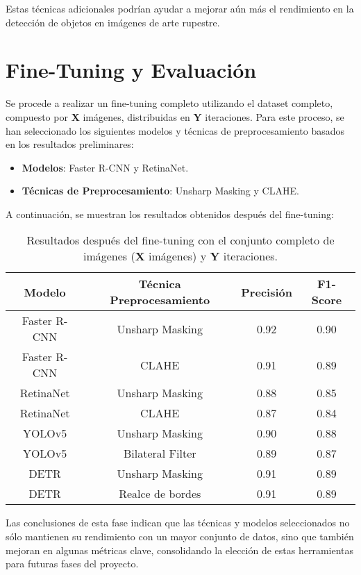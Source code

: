 Estas técnicas adicionales podrían ayudar a mejorar aún más el rendimiento en la detección de objetos en imágenes de arte rupestre.

\section{Fine-Tuning y Evaluación}
Se procede a realizar un fine-tuning completo utilizando el dataset completo, compuesto por \textbf{X} imágenes, distribuidas en \textbf{Y} iteraciones. Para este proceso, se han seleccionado los siguientes modelos y técnicas de preprocesamiento basados en los resultados preliminares:

\begin{itemize}
    \item \textbf{Modelos}: Faster R-CNN y RetinaNet.
    \item \textbf{Técnicas de Preprocesamiento}: Unsharp Masking y CLAHE.
\end{itemize}

A continuación, se muestran los resultados obtenidos después del fine-tuning:

\begin{table}[htbp]
    \centering
    \begin{tabular}{|c|c|c|c|}
        \hline
        Modelo & Técnica Preprocesamiento & Precisión & F1-Score \\ \hline
        Faster R-CNN & Unsharp Masking & 0.92 & 0.90 \\ \hline
        Faster R-CNN & CLAHE & 0.91 & 0.89 \\ \hline
        RetinaNet & Unsharp Masking & 0.88 & 0.85 \\ \hline
        RetinaNet & CLAHE & 0.87 & 0.84 \\ \hline
        YOLOv5 & Unsharp Masking & 0.90 & 0.88 \\ \hline
        YOLOv5 & Bilateral Filter & 0.89 & 0.87 \\ \hline
        DETR & Unsharp Masking & 0.91 & 0.89 \\ \hline
        DETR & Realce de bordes & 0.91 & 0.89 \\ \hline
    \end{tabular}
    \caption{Resultados después del fine-tuning con el conjunto completo de imágenes (\textbf{X} imágenes) y \textbf{Y} iteraciones.}
    \label{tab:resultados_fine_tuning}
\end{table}

Las conclusiones de esta fase indican que las técnicas y modelos seleccionados no sólo mantienen su rendimiento con un mayor conjunto de datos, sino que también mejoran en algunas métricas clave, consolidando la elección de estas herramientas para futuras fases del proyecto.

